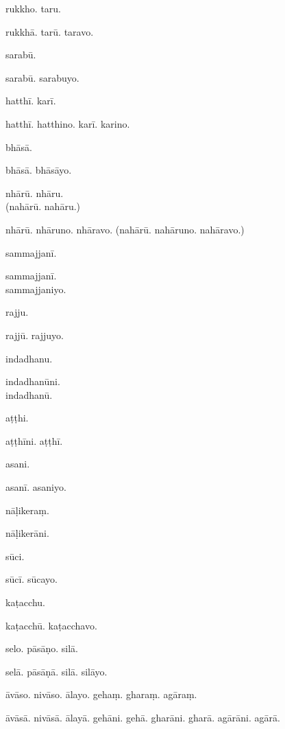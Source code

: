 \begin{multicols}{2}
\RaggedRight
\begin{answerkey}
\item rukkho. taru.
\item rukkh\=a. tar\=u. taravo.
\item sarab\=u.
\item sarab\=u. sarabuyo.
\item hatth\=i. kar\=i.
\item hatth\=i. hatthino. kar\=i. karino.
\item bh\=as\=a.
\item bh\=as\=a. bh\=as\=ayo.
\item nh\=ar\=u. nh\=aru. \\(nah\=ar\=u. nah\=aru.)
\item nh\=ar\=u. nh\=aruno. nh\=aravo. (nah\=ar\=u. nah\=aruno. nah\=aravo.)
\item sammajjan\=i.
\item sammajjan\=i. \\sammajjaniyo.
\item rajju.
\item rajj\=u. rajjuyo.
\item indadhanu.
\item indadhan\=uni. \\indadhan\=u.
\item a\d t\d thi.
\item a\d t\d th\=ini. a\d t\d th\=i.
\item asani.
\item asan\=i. asaniyo.
\item n\=a\d likera\d m.
\item n\=a\d liker\=ani.
\item s\=uci.
\item s\=uc\=i. s\=ucayo.
\item ka\d tacchu.
\item ka\d tacch\=u. ka\d tacchavo.
\item selo. p\=as\=a\d no. sil\=a.
\item sel\=a. p\=as\=a\d n\=a. sil\=a. sil\=ayo.
\item \=av\=aso. niv\=aso. \=alayo. geha\d m. ghara\d m. ag\=ara\d m.
\item \=av\=as\=a. niv\=as\=a. \=alay\=a. geh\=ani. geh\=a. ghar\=ani. ghar\=a. ag\=ar\=ani. ag\=ar\=a.
\end{answerkey}
\end{multicols}

